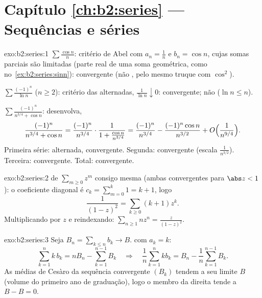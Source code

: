 \section*{Capítulo \ref{ch:b2:series} --- Sequências e séries}

\begin{solution}{exo:b2:series:1}
$\sum\frac{\cos n}{n}$: critério de Abel com $a_n = \frac1n$ e $b_n =
\cos n$, cujas somas parciais são limitadas (parte real de uma soma
geométrica, como no~\cref{ex:b2:series:sinn}): convergente (não ,
pelo mesmo truque com $\cos^2$).

$\sum \frac{(-1)^n}{\ln n}$ ($n \geq 2$): critério das alternadas,
$\frac{1}{\ln n} \downarrow 0$: convergente; não  ($\ln n
\leq n$).

$\sum \frac{(-1)^n}{n^{3/4} + \cos n}$: desenvolva,
\[
\frac{(-1)^n}{n^{3/4} + \cos n}
= \frac{(-1)^n}{n^{3/4}}\cdot
\frac{1}{1 + \frac{\cos n}{n^{3/4}}}
= \frac{(-1)^n}{n^{3/4}}
- \frac{(-1)^n\cos n}{n^{3/2}} + O\Bigl(\frac{1}{n^{9/4}}\Bigr).
\]
Primeira série: alternada, convergente. Segunda: 
convergente (escala $\frac{1}{n^{3/2}}$). Terceira: 
convergente. Total: convergente.
\end{solution}

\begin{solution}{exo:b2:series:2}
 de $\sum_{m\geq0} z^m$ consigo mesma (ambas 
convergentes para $\abs z < 1$): o coeficiente diagonal é $c_k =
\sum_{m=0}^{k} 1 = k + 1$, logo
\[
\frac{1}{(1-z)^2} = \sum_{k\geq0} (k+1)z^k .
\]
Multiplicando por $z$ e reindexando: $\sum_{n \geq 1} n z^n =
\frac{z}{(1-z)^2}$.
\end{solution}

\begin{solution}{exo:b2:series:3}
Seja $B_n = \sum_{k \leq n} b_k \to B$.  com $a_k = k$:
\[
\sum_{k=1}^{n} k\,b_k = n B_n - \sum_{k=1}^{n-1} B_k
\quad\Longrightarrow\quad
\frac1n \sum_{k=1}^{n} k b_k = B_n - \frac{1}{n}\sum_{k=1}^{n-1}
B_k .
\]
As médias de Cesàro da sequência convergente $(B_k)$ tendem a seu limite $B$
(volume do primeiro ano de graduação), logo o membro da direita tende a $B - B = 0$.
\end{solution}

